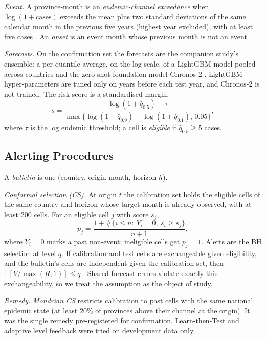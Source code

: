 \documentclass[conference]{IEEEtran}
\begin{document}
\textit{Event.} A province-month is an \emph{endemic-channel exceedance} when $\log(1+\text{cases})$ exceeds the mean plus two standard deviations of the same calendar month in the previous five years (highest year excluded), with at least five cases \cite{bortman1999}. An \emph{onset} is an event month whose previous month is not an event.

\textit{Forecasts.} On the confirmation set the forecasts are the companion study's ensemble: a per-quantile average, on the log scale, of a LightGBM model pooled across countries \cite{ke2017lightgbm} and the zero-shot foundation model Chronos-2 \cite{ansari2025chronos2}. LightGBM hyper-parameters are tuned only on years before each test year, and Chronos-2 is not trained. The risk score is a standardised margin,
\begin{equation}
s=\frac{\log(1+\hat q_{0.5})-\tau}{\max\{\log(1+\hat q_{0.9})-\log(1+\hat q_{0.1}),\,0.05\}},
\end{equation}
where $\tau$ is the log endemic threshold; a cell is \emph{eligible} if $\hat q_{0.5}\ge 5$ cases.

\subsection{Alerting Procedures}
A \emph{bulletin} is one (country, origin month, horizon $h$).

\textit{Conformal selection (CS).} At origin $t$ the calibration set holds the eligible cells of the same country and horizon whose target month is already observed, with at least 200 cells. For an eligible cell $j$ with score $s_j$,
\begin{equation}
p_j=\frac{1+\#\{i\le n:\ Y_i=0,\ s_i\ge s_j\}}{n+1},
\end{equation}
where $Y_i=0$ marks a past non-event; ineligible cells get $p_j=1$. Alerts are the BH selection at level $q$. If calibration and test cells are exchangeable given eligibility, and the bulletin's cells are independent given the calibration set, then $\mathbb{E}[V/\max(R,1)]\le q$ \cite{jin2023selection}. Shared forecast errors violate exactly this exchangeability, so we treat the assumption as the object of study.

\textit{Remedy.} \emph{Mondrian CS} restricts calibration to past cells with the same national epidemic state (at least 20\% of provinces above their channel at the origin). It was the single remedy pre-registered for confirmation. Learn-then-Test \cite{angelopoulos2021ltt} and adaptive level feedback \cite{gibbs2021} were tried on development data only.
\end{document}
